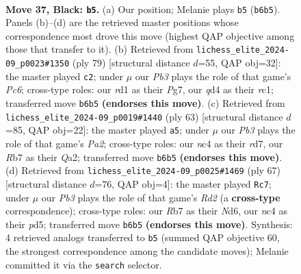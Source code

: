 \documentclass[11pt]{article}
\begin{document}
\clearpage

\begin{figure}[p]\centering
\begin{subfigure}{0.46\textwidth}\centering
\resizebox{\linewidth}{!}{%
\newchessgame
\chessboard[
  setfen={1r4k1/1r5p/1p6/p7/2NQ3P/8/PP3PP1/3R1K2 b - - 12 37},
  showmover=false,
  pgfstyle=straightmove, color=movearrow, markmove={b6-b5}
]}
\caption{}
\end{subfigure}\hfill
\begin{subfigure}{0.46\textwidth}\centering
\resizebox{\linewidth}{!}{%
\newchessgame
\chessboard[
  setfen={3r3k/3r1pp1/p3p2p/8/8/1Pp5/P5PP/2R2Q1K b - - 1 40},
  showmover=false,
  pgfstyle=straightmove, color=movearrow, markmove={c3-c2}
]}
\caption{}
\end{subfigure}
\\[4pt]
\begin{subfigure}{0.46\textwidth}\centering
\resizebox{\linewidth}{!}{%
\newchessgame
\chessboard[
  setfen={5rk1/pQ1R1pp1/6p1/8/8/1P2P2P/q4PP1/6K1 b - - 1 32},
  showmover=false,
  pgfstyle=straightmove, color=movearrow, markmove={a7-a5}
]}
\caption{}
\end{subfigure}\hfill
\begin{subfigure}{0.46\textwidth}\centering
\resizebox{\linewidth}{!}{%
\newchessgame
\chessboard[
  setfen={6k1/p2r1p2/1p1n2p1/3PN3/2PQ4/8/P5P1/6K1 b - - 5 34},
  showmover=false,
  pgfstyle=straightmove, color=movearrow, markmove={d7-c7}
]}
\caption{}
\end{subfigure}
\caption{\textbf{Move 37, Black: \texttt{b5}.} (a) Our position; Melanie plays \texttt{b5} (\texttt{b6b5}). Panels (b)--(d) are the retrieved master positions whose correspondence most drove this move (highest QAP objective among those that transfer to it). (b) Retrieved from \texttt{lichess\_elite\_2024-09\_p0023\#1350} (ply 79) [structural distance $d$=55, QAP obj=32]: the master played \texttt{c2}; under $\mu$ our \emph{Pb3} plays the role of that game's \emph{Pc6}; cross-type roles: our \emph{r}d1 as their \emph{P}g7, our \emph{q}d4 as their \emph{r}c1; transferred move \texttt{b6b5} \textbf{(endorses this move)}. (c) Retrieved from \texttt{lichess\_elite\_2024-09\_p0019\#1440} (ply 63) [structural distance $d$=85, QAP obj=22]: the master played \texttt{a5}; under $\mu$ our \emph{Pb3} plays the role of that game's \emph{Pa2}; cross-type roles: our \emph{n}c4 as their \emph{r}d7, our \emph{R}b7 as their \emph{Q}a2; transferred move \texttt{b6b5} \textbf{(endorses this move)}. (d) Retrieved from \texttt{lichess\_elite\_2024-09\_p0025\#1469} (ply 67) [structural distance $d$=76, QAP obj=4]: the master played \texttt{Rc7}; under $\mu$ our \emph{Pb3} plays the role of that game's \emph{Rd2} (a \textbf{cross-type} correspondence); cross-type roles: our \emph{R}b7 as their \emph{N}d6, our \emph{n}c4 as their \emph{p}d5; transferred move \texttt{b6b5} \textbf{(endorses this move)}. Synthesis: 4 retrieved analogs transferred to \texttt{b5} (summed QAP objective 60, the strongest correspondence among the candidate moves); Melanie committed it via the \texttt{search} selector.}
\label{fig:thought-m73}
\end{figure}
\end{document}
